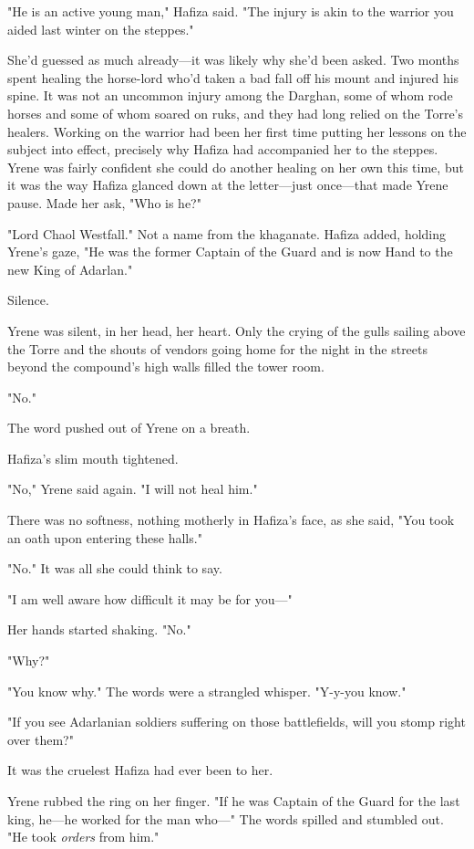 "He is an active young man," Hafiza said.
"The injury is akin to the warrior you aided last winter on the steppes."

She'd guessed as much already---it was likely why she'd been asked.
Two months spent healing the horse-lord who'd taken a bad fall off his mount and injured his spine.
It was not an uncommon injury among the Darghan, some of whom rode horses and some of whom soared on ruks, and they had long relied on the Torre's healers.
Working on the warrior had been her first time putting her lessons on the subject into effect, precisely why Hafiza had accompanied her to the steppes.
Yrene was fairly confident she could do another healing on her own this time, but it was the way Hafiza glanced down at the letter---just once---that made Yrene pause.
Made her ask, "Who is he?"

"Lord Chaol Westfall."
Not a name from the khaganate.
Hafiza added, holding Yrene's gaze, "He was the former Captain of the Guard and is now Hand to the new King of Adarlan." 

Silence.

Yrene was silent, in her head, her heart.
Only the crying of the gulls sailing above the Torre and the shouts of vendors going home for the night in the streets beyond the compound's high walls filled the tower room.

"No."

The word pushed out of Yrene on a breath.

Hafiza's slim mouth tightened.

"No," Yrene said again.
"I will not heal him."

There was no softness, nothing motherly in Hafiza's face, as she said, "You took an oath upon entering these halls."

"No."
It was all she could think to say.

"I am well aware how difficult it may be for you---"

Her hands started shaking.
"No."

"Why?"

"You know why."
The words were a strangled whisper.
"Y-y-you know."

"If you see Adarlanian soldiers suffering on those battlefields, will you stomp right over them?"

It was the cruelest Hafiza had ever been to her.

Yrene rubbed the ring on her finger.
"If he was Captain of the Guard for the last king, he---he worked for the man who---" The words spilled and stumbled out.
"He took \emph{orders} from him."

